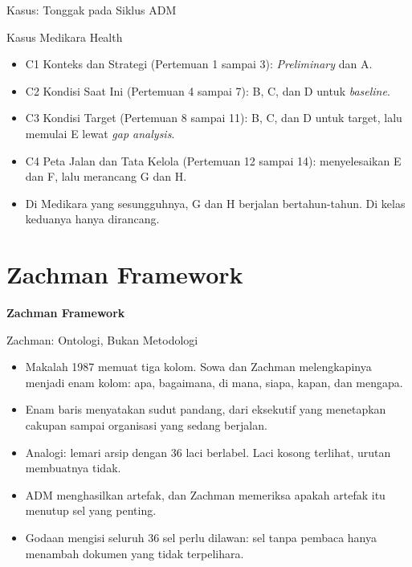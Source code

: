 \documentclass[aspectratio=169, table, 12pt]{beamer}
\begin{document}
\begin{frame}{{\Large Kasus: Tonggak pada Siklus ADM}}
  \begin{block}{Kasus Medikara Health}
    \small
    \begin{itemize}
      \item C1 Konteks dan Strategi (Pertemuan 1 sampai 3): \textit{Preliminary} dan A.
      \item C2 Kondisi Saat Ini (Pertemuan 4 sampai 7): B, C, dan D untuk \textit{baseline}.
      \item C3 Kondisi Target (Pertemuan 8 sampai 11): B, C, dan D untuk target, lalu memulai E lewat
            \textit{gap analysis}.
      \item C4 Peta Jalan dan Tata Kelola (Pertemuan 12 sampai 14): menyelesaikan E dan F, lalu merancang
            G dan H.
      \item Di Medikara yang sesungguhnya, G dan H berjalan bertahun-tahun. Di kelas keduanya hanya
            dirancang.
    \end{itemize}
  \end{block}
\end{frame}

\section{Zachman Framework}

\begin{frame}{\hfill}
  \centering
  \Huge{\textbf{Zachman Framework}}
\end{frame}

\begin{frame}{{\Large Zachman: Ontologi, Bukan Metodologi}}
  \vspace{6pt}
  \small
  \begin{itemize}
    \item Makalah 1987 memuat tiga kolom. Sowa dan Zachman melengkapinya menjadi enam kolom: apa,
          bagaimana, di mana, siapa, kapan, dan mengapa.
    \item Enam baris menyatakan sudut pandang, dari eksekutif yang menetapkan cakupan sampai organisasi
          yang sedang berjalan.
    \item Analogi: lemari arsip dengan 36 laci berlabel. Laci kosong terlihat, urutan membuatnya tidak.
    \item ADM menghasilkan artefak, dan Zachman memeriksa apakah artefak itu menutup sel yang penting.
    \item Godaan mengisi seluruh 36 sel perlu dilawan: sel tanpa pembaca hanya menambah dokumen yang
          tidak terpelihara.
  \end{itemize}
\end{frame}
\end{document}
